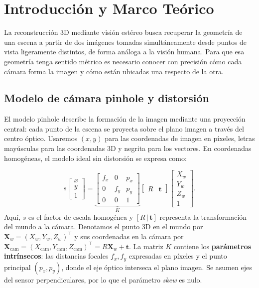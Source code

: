 \documentclass[a4paper,11pt]{article}
\begin{document}
\normalsize

\newpage

\section{Introducción y Marco Teórico}
La reconstrucción 3D mediante visión estéreo busca recuperar la geometría de una escena a partir de dos imágenes tomadas simultáneamente desde puntos de vista ligeramente distintos, de forma análoga a la visión humana. Para que esa geometría tenga sentido métrico es necesario conocer con precisión cómo cada cámara forma la imagen y cómo están ubicadas una respecto de la otra.

\subsection{Modelo de cámara pinhole y distorsión}
El modelo pinhole describe la formación de la imagen mediante una proyección central: cada punto de la escena se proyecta sobre el plano imagen a través del centro óptico. Usaremos $(x,y)$ para las coordenadas de imagen en píxeles, letras mayúsculas para las coordenadas 3D y negrita para los vectores. En coordenadas homogéneas, el modelo ideal sin distorsión se expresa como:

\begin{equation}
s \begin{bmatrix} x \\ y \\ 1 \end{bmatrix} =
\underbrace{\begin{bmatrix} f_x & 0 & p_x \\ 0 & f_y & p_y \\ 0 & 0 & 1 \end{bmatrix}}_{K}
\begin{bmatrix} R & \mathbf{t} \end{bmatrix}
\begin{bmatrix} X_w \\ Y_w \\ Z_w \\ 1 \end{bmatrix}.
\end{equation}
Aquí, $s$ es el factor de escala homogénea y $[R\,|\,\mathbf{t}]$ representa la transformación del mundo a la cámara. Denotamos el punto 3D en el mundo por $\mathbf{X}_w=(X_w,Y_w,Z_w)^\top$ y sus coordenadas en la cámara por $\mathbf{X}_{\mathrm{cam}}=(X_{\mathrm{cam}},Y_{\mathrm{cam}},Z_{\mathrm{cam}})^\top=R\mathbf{X}_w+\mathbf{t}$. La matriz $K$ contiene los \textbf{parámetros intrínsecos}: las distancias focales $f_x,f_y$ expresadas en píxeles y el punto principal $(p_x,p_y)$, donde el eje óptico interseca el plano imagen. Se asumen ejes del sensor perpendiculares, por lo que el parámetro \textit{skew} es nulo.
\end{document}
